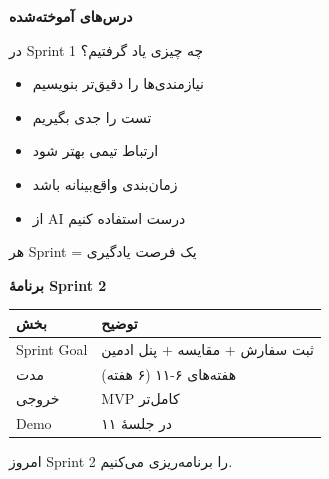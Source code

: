 \documentclass[14pt, a4paper, landscape]{extarticle}
\newcommand{\slide}[1]{%
    \newpage
    \begin{center}
    \begin{minipage}[t]{0.95\textwidth}
    \vspace{0.5cm}
    #1
    \vspace{0.5cm}
    \end{minipage}
    \end{center}
}
\newcommand{\slidetitle}[1]{%
    \begin{center}
        {\LARGE\bfseries\textcolor{primary}{#1}}
    \end{center}
    \vspace{0.5cm}
}
\newcommand{\myaccent}[1]{\textcolor{accent}{#1}}
\begin{document}
\slide{
    \slidetitle{درس‌های آموخته‌شده}
    \vspace{0.5cm}
    {\large در Sprint 1 چه چیزی یاد گرفتیم؟}
    \vspace{0.8cm}
    \begin{itemize}[itemsep=0.5em]
        \item {\large نیازمندی‌ها را دقیق‌تر بنویسیم}
        \item {\large تست را جدی بگیریم}
        \item {\large ارتباط تیمی بهتر شود}
        \item {\large زمان‌بندی واقع‌بینانه باشد}
        \item {\large از AI درست استفاده کنیم}
    \end{itemize}
    \vspace{0.8cm}
    \begin{center}
        {\large\myaccent{هر Sprint = یک فرصت یادگیری}}
    \end{center}
}

\slide{
    \slidetitle{برنامهٔ Sprint 2}
    \vspace{0.5cm}
    \begin{center}
        \begin{tabular}{lp{9cm}}
            \toprule
            \textbf{بخش} & \textbf{توضیح} \\
            \midrule
            Sprint Goal & ثبت سفارش + مقایسه + پنل ادمین \\
            \hline
            مدت & هفته‌های ۶-۱۱ (۶ هفته) \\
            \hline
            خروجی & MVP کامل‌تر \\
            \hline
            Demo & در جلسهٔ ۱۱ \\
            \bottomrule
        \end{tabular}
    \end{center}
    \vspace{0.8cm}
    \begin{center}
        {\myaccent{امروز Sprint 2 را برنامه‌ریزی می‌کنیم.}}
    \end{center}
}
\end{document}
